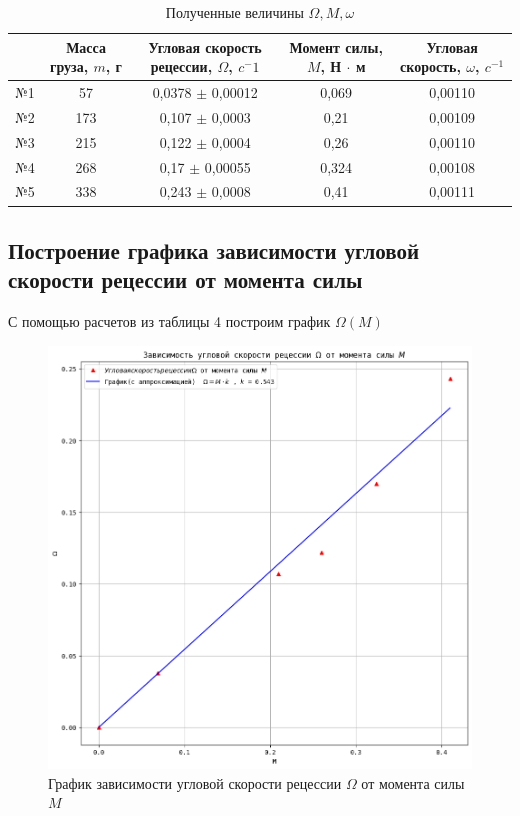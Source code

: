 \documentclass[a4paper]{article}
\begin{document}
\begin{table}[!h]
\begin{tabular}{|c|c|c|c|c|}
\hline
   & Масса груза, $m$, г & Угловая скорость рецессии, $\Omega$, $c{^-1}$ & Момент силы, $M$, Н $\cdot$ м & Угловая скорость, $\omega$, $c^{-1}$ \\ \hline
№1 & 57                  & 0,0378 $\pm$ 0,00012                                     & 0,069                                      & 0,00110                            \\ \hline
№2 & 173                 & 0,107  $\pm$ 0,0003                                   & 0,21                                       & 0,00109                            \\ \hline
№3 & 215                 & 0,122  $\pm$ 0,0004                                     & 0,26                                       & 0,00110                            \\ \hline
№4 & 268                 & 0,17  $\pm$ 0,00055                                      & 0,324                                      & 0,00108                            \\ \hline
№5 & 338                 & 0,243 $\pm$ 0,0008                                      & 0,41                                       & 0,00111                            \\ \hline
\end{tabular}
\caption{Полученные величины $\Omega, M, \omega$}
\end{table}
\newpage
\subsection{Построение графика зависимости угловой скорости рецессии от момента силы}
С помощью расчетов из таблицы 4 построим график $\Omega(M)$
\begin{figure}[h!]
    \centering
    \includegraphics[width=1\textwidth]{graphic}
    \caption{График зависимости угловой скорости рецессии $\Omega$ от момента силы $M$}
\end{figure}
\end{document}
